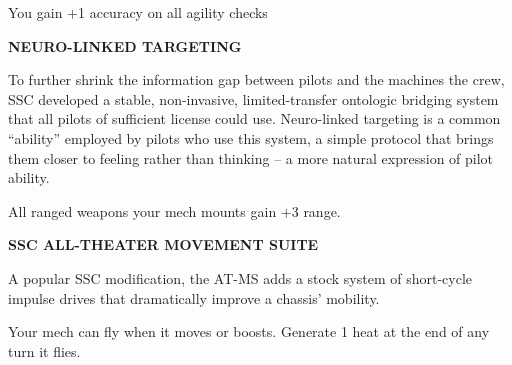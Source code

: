 You gain +1 accuracy on all agility checks


\textbf{NEURO-LINKED TARGETING}

To further shrink the information gap between pilots and the machines the crew, SSC developed a stable, non-invasive, limited-transfer ontologic bridging system that all pilots of sufficient license could use. Neuro-linked targeting is a common ``ability'' employed by pilots who use this system, a simple protocol that brings them closer to feeling rather than thinking -- a more natural expression of pilot ability.

All ranged weapons your mech mounts gain +3 range.


\textbf{SSC ALL-THEATER MOVEMENT SUITE}

A popular SSC modification, the AT-MS adds a stock system of short-cycle impulse drives that dramatically improve a chassis' mobility.

Your mech can fly when it moves or boosts. Generate 1 heat at the end of any turn it flies.


